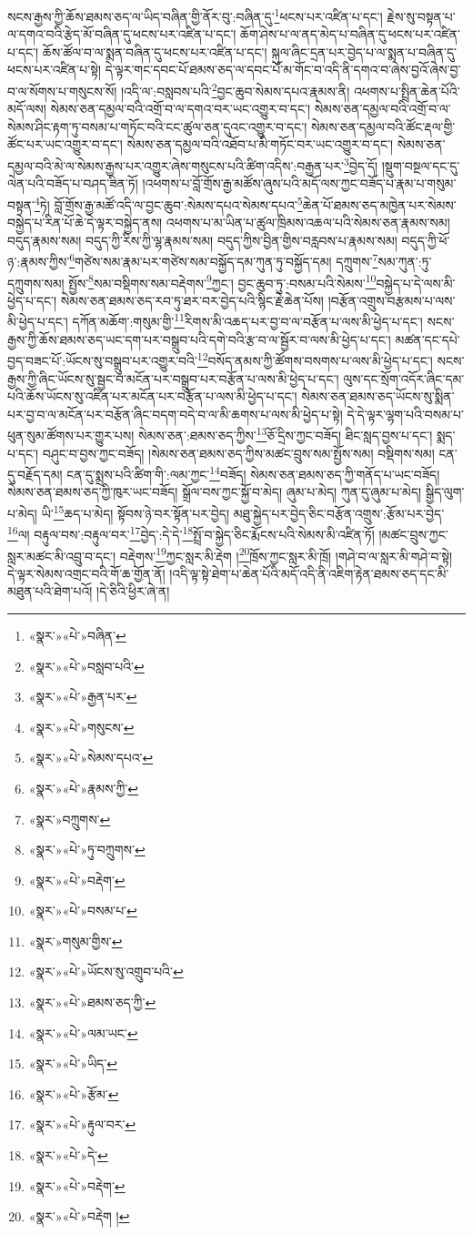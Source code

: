སངས་རྒྱས་ཀྱི་ཆོས་ཐམས་ཅད་ལ་ཡིད་བཞིན་གྱི་ནོར་བུ་:བཞིན་དུ་\footnote{«སྣར་»«པེ་»བཞིན་}ཕངས་པར་འཛིན་པ་དང་། རྗེས་སུ་བསྟན་པ་ལ་དགའ་བའི་རྩེད་མོ་བཞིན་དུ་ཕངས་པར་འཛིན་པ་དང་། ཆོག་ཤེས་པ་ལ་ནད་མེད་པ་བཞིན་དུ་ཕངས་པར་འཛིན་པ་དང་། ཆོས་ཚོལ་བ་ལ་སྨན་བཞིན་དུ་ཕངས་པར་འཛིན་པ་དང་། སྐུལ་ཞིང་དྲན་པར་བྱེད་པ་ལ་སྨན་པ་བཞིན་དུ་ཕངས་པར་འཛིན་པ་སྟེ། དེ་ལྟར་གང་དབང་པོ་ཐམས་ཅད་ལ་དབང་པོ་མ་གོང་བ་འདི་ནི་དགའ་བ་ཞེས་བྱའོ་ཞེས་བྱ་བ་ལ་སོགས་པ་གསུངས་སོ། །འདི་ལ་:བསླབས་པའི་\footnote{«སྣར་»«པེ་»བསླབ་པའི་}བྱང་ཆུབ་སེམས་དཔའ་རྣམས་ནི། འཕགས་པ་སྤྲིན་ཆེན་པོའི་མདོ་ལས། སེམས་ཅན་དམྱལ་བའི་འགྲོ་བ་ལ་དགའ་བར་ཡང་འགྱུར་བ་དང་། སེམས་ཅན་དམྱལ་བའི་འགྲོ་བ་ལ་སེམས་ཤིང་རྟག་ཏུ་བསམ་པ་གཏོང་བའི་ངང་ཚུལ་ཅན་དུའང་འགྱུར་བ་དང་། སེམས་ཅན་དམྱལ་བའི་ཚོང་རྡལ་གྱི་ཚོང་པར་ཡང་འགྱུར་བ་དང་། སེམས་ཅན་དམྱལ་བའི་འཐོབ་པ་མི་གཏོང་བར་ཡང་འགྱུར་བ་དང་། སེམས་ཅན་དམྱལ་བའི་མེ་ལ་སེམས་རྒྱས་པར་འགྱུར་ཞེས་གསུངས་པའི་ཚིག་འདིས་:བརྒྱན་པར་\footnote{«སྣར་»«པེ་»རྒྱན་པར་}བྱེད་དོ། །སྡུག་བསྔལ་དང་དུ་ལེན་པའི་བཟོད་པ་བཤད་ཟིན་ཏོ། །འཕགས་པ་བློ་གྲོས་རྒྱ་མཚོས་ཞུས་པའི་མདོ་ལས་ཀྱང་བཟོད་པ་རྣམ་པ་གསུམ་བསྟན་\footnote{«སྣར་»«པེ་»གསུངས་}ཏེ། བློ་གྲོས་རྒྱ་མཚོ་འདི་ལ་བྱང་ཆུབ་:སེམས་དཔའ་སེམས་དཔའ་\footnote{«སྣར་»«པེ་»སེམས་དཔའ་}ཆེན་པོ་ཐམས་ཅད་མཁྱེན་པར་སེམས་བསྐྱེད་པ་རིན་པོ་ཆེ་དེ་ལྟར་བསྐྱེད་ནས། འཕགས་པ་མ་ཡིན་པ་ཚུལ་ཁྲིམས་འཆལ་པའི་སེམས་ཅན་རྣམས་སམ། བདུད་རྣམས་སམ། བདུད་ཀྱི་རིས་ཀྱི་ལྷ་རྣམས་སམ། བདུད་ཀྱིས་བྱིན་གྱིས་བརླབས་པ་རྣམས་སམ། བདུད་ཀྱི་ཕོ་ཉ་:རྣམས་ཀྱིས་\footnote{«སྣར་»«པེ་»རྣམས་ཀྱི་}གཙེས་སམ་རྣམ་པར་གཙེས་སམ་བསྐྱོད་དམ་ཀུན་ཏུ་བསྐྱོད་དམ། དཀྲུགས་\footnote{«སྣར་»བཀྲུགས་}སམ་ཀུན་:ཏུ་དཀྲུགས་སམ། སྤྱོས་\footnote{«སྣར་»«པེ་»ཏུ་བཀྲུགས་}སམ་བསྡིགས་སམ་བརྡེགས་\footnote{«སྣར་»«པེ་»བརྡེག་}ཀྱང་། བྱང་ཆུབ་ཏུ་:བསམ་པའི་སེམས་\footnote{«སྣར་»«པེ་»བསམ་པ་}བསྐྱེད་པ་དེ་ལས་མི་ཕྱེད་པ་དང་། སེམས་ཅན་ཐམས་ཅད་རབ་ཏུ་ཐར་བར་བྱེད་པའི་སྙིང་རྗེ་ཆེན་པོས། །བརྩོན་འགྲུས་བརྩམས་པ་ལས་མི་ཕྱེད་པ་དང་། དཀོན་མཆོག་:གསུམ་གྱི་\footnote{«སྣར་»གསུམ་གྱིས་}རིགས་མི་འཆད་པར་བྱ་བ་ལ་བརྩོན་པ་ལས་མི་ཕྱེད་པ་དང་། སངས་རྒྱས་ཀྱི་ཆོས་ཐམས་ཅད་ཡང་དག་པར་བསྒྲུབ་པའི་དགེ་བའི་རྩ་བ་ལ་སྦྱོར་བ་ལས་མི་ཕྱེད་པ་དང་། མཚན་དང་དཔེ་བྱད་བཟང་པོ་:ཡོངས་སུ་བསྒྲུབ་པར་འགྱུར་བའི་\footnote{«སྣར་»«པེ་»ཡོངས་སུ་འགྲུབ་པའི་}བསོད་ནམས་ཀྱི་ཚོགས་བསགས་པ་ལས་མི་ཕྱེད་པ་དང་། སངས་རྒྱས་ཀྱི་ཞིང་ཡོངས་སུ་སྦྱང་བ་མངོན་པར་བསྒྲུབ་པར་བརྩོན་པ་ལས་མི་ཕྱེད་པ་དང་། ལུས་དང་སྲོག་འདོར་ཞིང་དམ་པའི་ཆོས་ཡོངས་སུ་འཛིན་པར་མངོན་པར་བརྩོན་པ་ལས་མི་ཕྱེད་པ་དང་། སེམས་ཅན་ཐམས་ཅད་ཡོངས་སུ་སྨིན་པར་བྱ་བ་ལ་མངོན་པར་བརྩོན་ཞིང་བདག་བདེ་བ་ལ་མི་ཆགས་པ་ལས་མི་ཕྱེད་པ་སྟེ། དེ་དེ་ལྟར་ལྷག་པའི་བསམ་པ་ཕུན་སུམ་ཚོགས་པར་གྱུར་པས། སེམས་ཅན་:ཐམས་ཅད་ཀྱིས་\footnote{«སྣར་»«པེ་»ཐམས་ཅད་ཀྱི་}ཅོ་དྲིས་ཀྱང་བཟོད། ཐིང་སླད་བྱས་པ་དང་། སྨད་པ་དང་། བཤུང་བ་བྱས་ཀྱང་བཟོད། །སེམས་ཅན་ཐམས་ཅད་ཀྱིས་མཚང་བྲུས་སམ་སྤྱོས་སམ། བསྡིགས་སམ། ངན་དུ་བརྗོད་དམ། ངན་དུ་སྨྲས་པའི་ཚིག་གི་:ལམ་ཀྱང་\footnote{«སྣར་»«པེ་»ལམ་ཡང་}བཟོད། སེམས་ཅན་ཐམས་ཅད་ཀྱི་གནོད་པ་ཡང་བཟོད། སེམས་ཅན་ཐམས་ཅད་ཀྱི་ཁུར་ཡང་བཟོད། སྒྲོལ་བས་ཀྱང་སྐྱོ་བ་མེད། ཞུམ་པ་མེད། ཀུན་དུ་ཞུམ་པ་མེད། སྒྱིད་ལུག་པ་མེད། ཡི་\footnote{«སྣར་»«པེ་»ཡིད་}ཆད་པ་མེད། སྟོབས་ཉེ་བར་སྟོན་པར་བྱེད། མཐུ་སྐྱེད་པར་བྱེད་ཅིང་བརྩོན་འགྲུས་:རྩོམ་པར་བྱེད་\footnote{«སྣར་»«པེ་»རྩོམ་}ལ། བརྟུལ་བས་:བརྟུལ་བར་\footnote{«སྣར་»«པེ་»རྟུལ་བར་}བྱེད་:དེ་དེ་\footnote{«སྣར་»«པེ་»དེ་}སྤྲོ་བ་སྐྱེད་ཅིང་རྨོངས་པའི་སེམས་མི་འཛིན་ཏོ། །མཚང་བྲུས་ཀྱང་སླར་མཚང་མི་འབྲུ་བ་དང་། བརྡེགས་\footnote{«སྣར་»«པེ་»བརྡེག་}ཀྱང་སླར་མི་རྡེག །\footnote{«སྣར་»«པེ་»བརྡེག །}ཁྲོས་ཀྱང་སླར་མི་ཁྲོ། །གཤེ་བ་ལ་སླར་མི་གཤེ་བ་སྟེ། དེ་ལྟར་སེམས་འགྲང་བའི་གོ་ཆ་གྱོན་ནོ། །འདི་ལྟ་སྟེ་ཐེག་པ་ཆེན་པོའི་མདོ་འདི་ནི་འཇིག་རྟེན་ཐམས་ཅད་དང་མི་མཐུན་པའི་ཐེག་པའོ། །དེ་ཅིའི་ཕྱིར་ཞེ་ན། 